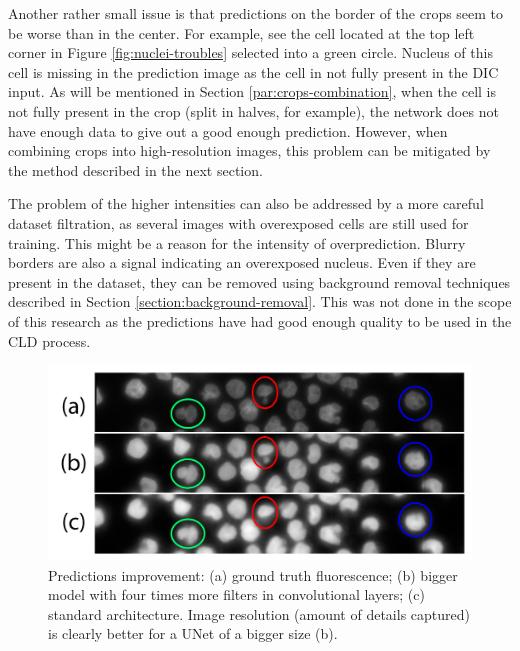 Another rather small issue is that predictions on the border of the crops seem to be worse than in the center. For example, see the cell located at the top left corner in Figure \ref{fig:nuclei-troubles} selected into a green circle. Nucleus of this cell is missing in the prediction image as the cell in not fully present in the DIC input. As will be mentioned in Section \ref{par:crops-combination}, when the cell is not fully present in the crop (split in halves, for example), the network does not have enough data to give out a good enough prediction. However, when combining crops into high-resolution images, this problem can be mitigated by the method described in the next section.

The problem of the higher intensities can also be addressed by a more careful dataset filtration, as several images with overexposed cells are still used for training. This might be a reason for the intensity of overprediction. Blurry borders are also a signal indicating an overexposed nucleus. Even if they are present in the dataset, they can be removed using background removal techniques described in Section \ref{section:background-removal}. This was not done in the scope of this research as the predictions have had good enough quality to be used in the CLD process.

\begin{figure}[htb]
	\begin{center}
		\includegraphics[width=0.6\linewidth]{bilder/nuclei/bigger-model.png}
		\caption[Predictions improvement]%
		{Predictions improvement: (a) ground truth fluorescence; (b) bigger model with four times more filters in convolutional layers; (c) standard architecture. Image resolution (amount of details captured) is clearly better for a UNet of a bigger size (b). }\label{fig:better-nuclei}
	\end{center}
\end{figure}
